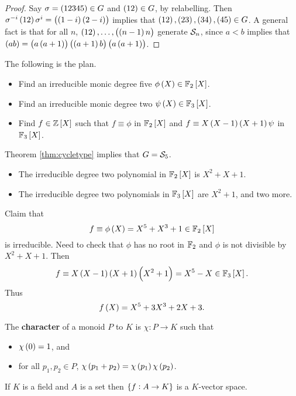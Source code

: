 \begin{proof}
Say $ \sigma = \br{12345} \in G $ and $ \br{12} \in G $, by relabelling. Then $ \sigma^{-i}\br{12}\sigma^i = \br{\br{1 - i}\br{2 - i}} $ implies that $ \br{12}, \br{23}, \br{34}, \br{45} \in G $. A general fact is that for all $ n $, $ \br{12}, \dots, \br{\br{n - 1}n} $ generate $ \mathcal{S}_n $, since $ a < b $ implies that $ \br{ab} = \br{a\br{a + 1}}\br{\br{a + 1}b}\br{a\br{a + 1}} $.
\end{proof}

The following is the plan.
\begin{itemize}
\item Find an irreducible monic degree five $ \phi\br{X} \in \FF_2\sbr{X} $.
\item Find an irreducible monic degree two $ \psi\br{X} \in \FF_3\sbr{X} $.
\item Find $ f \in \ZZ\sbr{X} $ such that $ f \equiv \phi $ in $ \FF_2\sbr{X} $ and $ f \equiv X\br{X - 1}\br{X + 1}\psi $ in $ \FF_3\sbr{X} $.
\end{itemize}
Theorem \ref{thm:cycletype} implies that $ G = \mathcal{S}_5 $.
\begin{itemize}
\item The irreducible degree two polynomial in $ \FF_2\sbr{X} $ is $ X^2 + X + 1 $.
\item The irreducible degree two polynomials in $ \FF_3\sbr{X} $ are $ X^2 + 1 $, and two more.
\end{itemize}
Claim that
$$ f \equiv \phi\br{X} = X^5 + X^3 + 1 \in \FF_2\sbr{X} $$
is irreducible. Need to check that $ \phi $ has no root in $ \mathbb{F}_2 $ and $ \phi $ is not divisible by $ X^2 + X + 1 $. Then
$$ f \equiv X\br{X - 1}\br{X + 1}\br{X^2 + 1} = X^5 - X \in \FF_3\sbr{X}. $$
Thus
$$ f\br{X} = X^5 + 3X^3 + 2X + 3. $$


\begin{definition}
The \textbf{character} of a monoid $ P $ to $ K $ is $ \chi : P \to K $ such that
\begin{itemize}
\item $ \chi\br{0} = 1 $, and
\item for all $ p_1, p_2 \in P $, $ \chi\br{p_1 + p_2} = \chi\br{p_1}\chi\br{p_2} $.
\end{itemize}
\end{definition}

\begin{remark*}
If $ K $ is a field and $ A $ is a set then $ \cbr{f : A \to K} $ is a $ K $-vector space.
\end{remark*}


